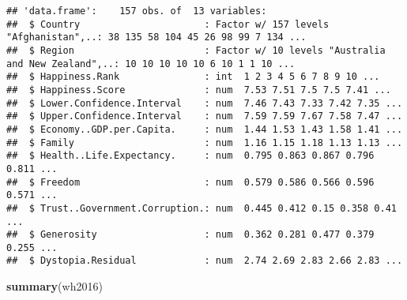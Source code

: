 \documentclass[]{article}
\newenvironment{Shaded}{\begin{snugshade}}{\end{snugshade}}
\newcommand{\KeywordTok}[1]{\textcolor[rgb]{0.13,0.29,0.53}{\textbf{#1}}}
\newcommand{\NormalTok}[1]{#1}
\begin{document}
\begin{verbatim}
## 'data.frame':    157 obs. of  13 variables:
##  $ Country                      : Factor w/ 157 levels "Afghanistan",..: 38 135 58 104 45 26 98 99 7 134 ...
##  $ Region                       : Factor w/ 10 levels "Australia and New Zealand",..: 10 10 10 10 10 6 10 1 1 10 ...
##  $ Happiness.Rank               : int  1 2 3 4 5 6 7 8 9 10 ...
##  $ Happiness.Score              : num  7.53 7.51 7.5 7.5 7.41 ...
##  $ Lower.Confidence.Interval    : num  7.46 7.43 7.33 7.42 7.35 ...
##  $ Upper.Confidence.Interval    : num  7.59 7.59 7.67 7.58 7.47 ...
##  $ Economy..GDP.per.Capita.     : num  1.44 1.53 1.43 1.58 1.41 ...
##  $ Family                       : num  1.16 1.15 1.18 1.13 1.13 ...
##  $ Health..Life.Expectancy.     : num  0.795 0.863 0.867 0.796 0.811 ...
##  $ Freedom                      : num  0.579 0.586 0.566 0.596 0.571 ...
##  $ Trust..Government.Corruption.: num  0.445 0.412 0.15 0.358 0.41 ...
##  $ Generosity                   : num  0.362 0.281 0.477 0.379 0.255 ...
##  $ Dystopia.Residual            : num  2.74 2.69 2.83 2.66 2.83 ...
\end{verbatim}

\begin{Shaded}
\begin{Highlighting}[]
\KeywordTok{summary}\NormalTok{(wh2016)}
\end{Highlighting}
\end{Shaded}
\end{document}
